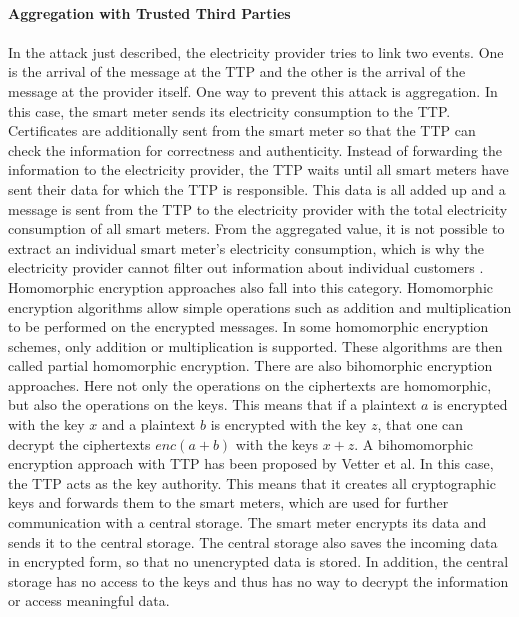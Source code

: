\\
\textbf{Aggregation with Trusted Third Parties}
\\
\\
In the attack just described, the electricity provider tries to link two events. One is the arrival of the message at the \gls{TTP} and the other is the arrival of the message at the provider itself. One way to prevent this attack is aggregation. In this case, the smart meter sends its electricity consumption to the \gls{TTP}. Certificates are additionally sent from the smart meter so that the \gls{TTP} can check the information for correctness and authenticity. Instead of forwarding the information to the electricity provider, the \gls{TTP} waits until all smart meters have sent their data for which the \gls{TTP} is responsible. This data is all added up and a message is sent from the \gls{TTP} to the electricity provider with the total electricity consumption of all smart meters. From the aggregated value, it is not possible to extract an individual smart meter's electricity consumption, which is why the electricity provider cannot filter out information about individual customers \cite{bohli2010privacy}.\\
Homomorphic encryption approaches also fall into this category. Homomorphic encryption algorithms allow simple operations such as addition and multiplication to be performed on the encrypted messages.  In some homomorphic encryption schemes, only addition or multiplication is supported. These algorithms are then called partial homomorphic encryption.
There are also bihomorphic encryption approaches. Here not only the operations on the ciphertexts are homomorphic, but also the operations on the keys. This means that if a plaintext $a$ is encrypted with the key $x$ and a plaintext $b$ is encrypted with the key $z$, that one can decrypt the ciphertexts $enc(a+b)$ with the keys $x+z$. A bihomomorphic encryption approach with \gls{TTP} has been proposed by Vetter et al\cite{vetter2012homomorphic}. In this case, the \gls{TTP} acts as the key authority. This means that it creates all cryptographic keys and forwards them to the smart meters, which are used for further communication with a central storage. The smart meter encrypts its data and sends it to the central storage. The central storage also saves the incoming data in encrypted form, so that no unencrypted data is stored. In addition, the central storage has no access to the keys and thus has no way to decrypt the information or access meaningful data.\\
